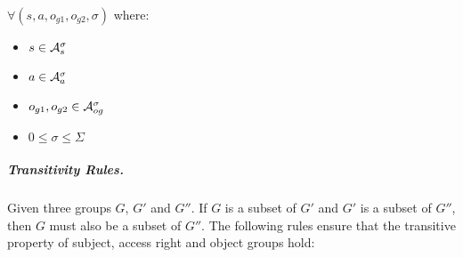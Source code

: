 \documentclass[10pt, twocolumn]{article}
\begin{document}
\begin{enumerate}
                $\forall (s, a, o_{g1}, o_{g2}, \sigma)$ where:

                \begin{itemize}
                  \item
                    $s \in {\cal A}^{\sigma}_{s}$
                  \item
                    $a \in {\cal A}^{\sigma}_{a}$
                  \item
                    $o_{g1}, o_{g2} \in {\cal A}^{\sigma}_{og}$
                  \item
                    $0 \leq \sigma \leq \Sigma$
                \end{itemize}
            \end{enumerate}

          \subparagraph{Transitivity Rules.}

            Given three groups $G$, $G'$ and $G''$. If $G$ is a subset of $G'$
            and $G'$ is a subset of $G''$, then $G$ must also be a subset of
            $G''$. The following rules ensure that the transitive property of
            subject, access right and object groups hold:
\end{document}
